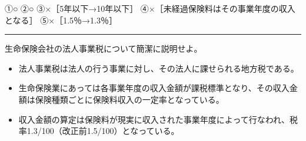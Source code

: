\documentclass[report,gutter=10mm,fore-edge=10mm,uplatex,dvipdfmx]{jlreq}
\begin{document}

①○ ②○ ③×［5年以下→10年以下］
④×［未経過保険料はその事業年度の収入となる］ ⑤×［1.5％→1.3％］

\begin{center}\rule{0.5\linewidth}{0.5pt}\end{center}


生命保険会社の法人事業税について簡潔に説明せよ。


\begin{itemize}
\tightlist
\item
  法人事業税は法人の行う事業に対し、その法人に課せられる地方税である。
\item
  生命保険業にあっては各事業年度の収入金額が課税標準となり、その収入金額は保険種類ごとに保険料収入の一定率となっている。
\item
  収入金額の算定は保険料が現実に収入された事業年度によって行なわれ、税率1.3/100（改正前1.5/100）となっている。
\end{itemize}
\end{document}
